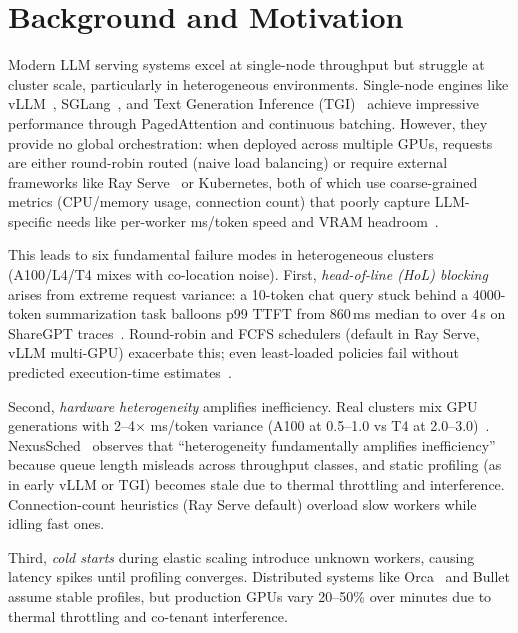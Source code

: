 \documentclass[10pt,twocolumn,letterpaper]{article}
\begin{document}

\section{Background and Motivation}
\label{sec:background}

Modern LLM serving systems excel at single-node throughput but struggle at cluster scale, particularly in heterogeneous environments. Single-node engines like vLLM~\cite{vllm}, SGLang~\cite{sglang}, and Text Generation Inference (TGI)~\cite{tgi} achieve impressive performance through PagedAttention and continuous batching. However, they provide no global orchestration: when deployed across multiple GPUs, requests are either round-robin routed (naive load balancing) or require external frameworks like Ray Serve~\cite{rayserve} or Kubernetes, both of which use coarse-grained metrics (CPU/memory usage, connection count) that poorly capture LLM-specific needs like per-worker ms/token speed and VRAM headroom~\cite{nexussched}.

This leads to six fundamental failure modes in heterogeneous clusters (A100/L4/T4 mixes with co-location noise). First, \emph{head-of-line (HoL) blocking} arises from extreme request variance: a 10-token chat query stuck behind a 4000-token summarization task balloons p99 TTFT from 860\,ms median to over 4\,s on ShareGPT traces~\cite{sharegpt}. Round-robin and FCFS schedulers (default in Ray Serve, vLLM multi-GPU) exacerbate this; even least-loaded policies fail without predicted execution-time estimates~\cite{sjf}.

Second, \emph{hardware heterogeneity} amplifies inefficiency. Real clusters mix GPU generations with 2--4$\times$ ms/token variance (A100 at 0.5--1.0 vs T4 at 2.0--3.0)~\cite{nexussched}. NexusSched~\cite{nexussched} observes that ``heterogeneity fundamentally amplifies inefficiency'' because queue length misleads across throughput classes, and static profiling (as in early vLLM or TGI) becomes stale due to thermal throttling and interference. Connection-count heuristics (Ray Serve default) overload slow workers while idling fast ones.

Third, \emph{cold starts} during elastic scaling introduce unknown workers, causing latency spikes until profiling converges. Distributed systems like Orca~\cite{orca} and Bullet assume stable profiles, but production GPUs vary 20--50\% over minutes due to thermal throttling and co-tenant interference.
\end{document}
